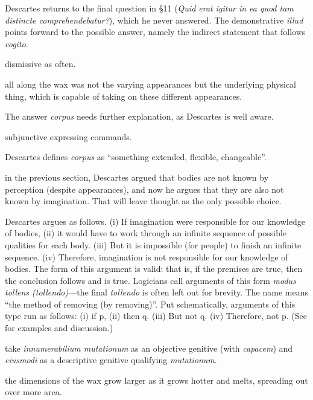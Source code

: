  Descartes returns to the final question in §11 (\textit{Quid erat igitur in ea quod tam distincte comprehendebatur?}), which he never answered. The demonstrative \textit{illud} points forward to the possible answer, namely the indirect statement that follows \textit{cogito}.

 dismissive as often.

 all along the wax was not the varying appearances but the underlying physical thing, which is capable of taking on these different appearances.

 The answer \textit{corpus} needs further explanation, as Descartes is well aware.

 subjunctive expressing commands.

 Descartes defines \textit{corpus} as ``something extended, flexible, changeable''.

 in the previous section, Descartes argued that bodies are not known by perception (despite appearances), and now he argues that they are also not known by imagination. That will leave thought as the only possible choice.

 Descartes argues as follows. (i) If imagination were responsible for our knowledge of bodies, (ii) it would have to work through an infinite sequence of possible qualities for each body. (iii) But it is impossible (for people) to finish an infinite sequence. (iv) Therefore, imagination is not responsible for our knowledge of bodies. The form of this argument is valid: that is, if the premises are true, then the conclusion follows and is true. Logicians call arguments of this form \textit{modus tollens (tollendo)}---the final \textit{tollendo} is often left out for brevity. The name means ``the method of removing (by removing)''. Put schematically, arguments of this type run as follows: (i) if p, (ii) then q. (iii) But not q. (iv) Therefore, not p. (See \cite[§23]{weston2009} for examples and discussion.)

 take \textit{innumerabilium mutationum} as an objective genitive (with \textit{capacem}) and \textit{eiusmodi} as a descriptive genitive qualifying \textit{mutationum}.

 the dimensions of the wax grow larger as it grows hotter and melts, spreading out over more area.

